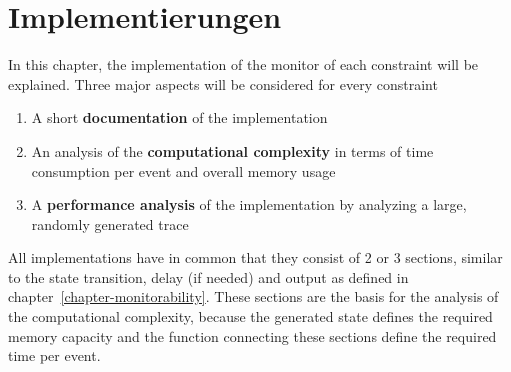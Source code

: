 
\chapter{Implementierungen}
\label{chapter-implementation}

	In this chapter, the implementation of the monitor of each constraint will be explained. Three major aspects will be considered for every constraint
	\begin{enumerate}[1.]
		\item
			A short \textbf{documentation} of the implementation
		\item
			An analysis of the \textbf{computational complexity} in terms of time consumption per event and overall memory usage
		\item
			A \textbf{performance analysis} of the implementation by analyzing a large, randomly generated trace
	\end{enumerate}

	All implementations have in common that they consist of 2 or 3 sections, similar to the state transition, delay (if needed) and output as defined in chapter~\ref{chapter-monitorability}. These sections are the basis for the analysis of the computational complexity, because the generated state defines the required memory capacity and the function connecting these sections define the required time per event.
	
	 

